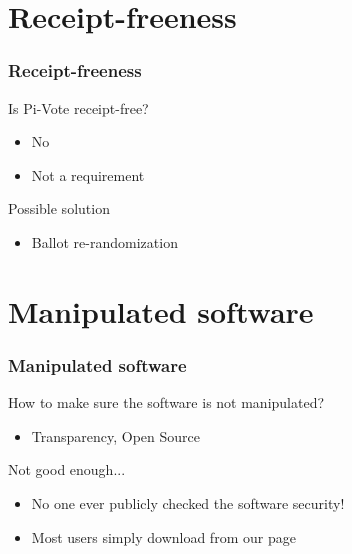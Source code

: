 \documentclass[aspectratio=1610, compress, bigger]{beamer}
\begin{document}
\section{Receipt-freeness}
\begin{frame}\frametitle{Receipt-freeness}

\begin{block}{Is Pi-Vote receipt-free?}
\begin{itemize}
\item No
\item Not a requirement
\end{itemize}
\end{block}

\pause

\begin{block}{Possible solution}
\begin{itemize}
\item Ballot re-randomization
\end{itemize}
\end{block}

\end{frame}

\section{Manipulated software}
\begin{frame}\frametitle{Manipulated software}

\begin{block}{How to make sure the software is not manipulated?}
\begin{itemize}
\item Transparency, Open Source
\end{itemize}
\end{block}

\pause

\begin{alertblock}{Not good enough...}
\begin{itemize}
\item No one ever publicly checked the software security!
\item Most users simply download from our page
\end{itemize}
\end{alertblock}

\end{frame}
\end{document}
